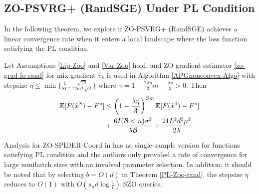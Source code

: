 \subsection{ZO-PSVRG+ (RandSGE) Under PL Condition}
In the following theorem, we explore if ZO-PSVRG+ (RandSGE) achieves a linear convergence rate when it enters a local landscape where the loss function satisfying the PL condition.
\begin{theorem}\label{PL-Zoo-rand}
Let Assumptions \ref{Lip-Zoo} and \ref{Var-Zoo} hold, and  ZO gradient estimator \eqref{zo-grad-fo-rand} for mix gradient $\hat{v}_k$ is used in
 Algorithm \ref{APGnonconvex-Algo} with stepsize $\eta \leq \min\{\frac{1}{8L}, \frac{\sqrt{\gamma b}}{12 m L \sqrt{d}}\}$ where $\gamma = 1-\frac{2\lambda\eta}{3} m-\frac{\lambda\eta}{3} > 0$. Then 
\begin{align}
\mathbb{E}[F(\tilde{x}^S) - {F}^*] & \leq   \left(1-\frac{\lambda\eta}{3}\right)^{Sm} \mathbb{E}[F(\tilde{x}^0) - {F}^*]\notag\\
&  + \frac{6I(\mathcal{B} < n) \sigma ^2}{\lambda\mathcal{B}}+\frac{21 L^2 d^2 \mu^2}{2\lambda}\label{PL-eq-error-rand}
\end{align}
\end{theorem}
\iffalse
\begin{corollary}\label{PL-Zo-Cor-rand}
Suppose the final iteration point $\tilde{x}^S$ in Algorithm \ref{APGnonconvex-Algo} satisfies $\E[F(\tilde{x}^S) - F^*]\leq \epsilon$ under PL condition. Under Assumptions \ref{Lip-Zoo} and \ref{Var-Zoo}, we let batch size $\mathcal{B} = \min\{\frac{6\sigma^2}{\lambda\epsilon},n\}$ and the smoothing parameter $\mu \leq \frac{\sqrt{\lambda\epsilon}}{4 L d}$. The number of SZO calls is bounded by
\[
(S\mathcal{B}d+Smb) = O(\frac{s_n d}{\lambda\eta m}\log\frac{1}{\epsilon}+\frac{b }{\lambda\eta}\log\frac{1}{\epsilon})
\]
where $s_n = \min \{n,\frac{1}{\lambda \epsilon}\}$.
The number of PO calls equals to the total number of iterations $T$ which is bounded by
\[
T = Sm = O(\frac{1}{\lambda\eta}\log\frac{1}{\epsilon})
\]
In particular, given the setting  $m=\sqrt{b}$ and $\eta = \frac{\sqrt{\gamma}}{12 L\sqrt{d}}$, the number of SZO calls  simplifies to 
$(S\mathcal{B}d+Smb) = O(\frac{\mathcal{B}d\sqrt{d}}{\lambda\sqrt{\gamma} m}\log\frac{1}{\epsilon}+\frac{b\sqrt{d}}{\lambda\sqrt{\gamma}}\log\frac{1}{\epsilon})$.
\end{corollary}
\fi
\begin{remark}
Analysis for ZO-SPIDER-Coord in \cite{ji2019improved} has no single-sample version for functions satisfying PL condition and the authors only provided a rate of convergence for large minibatch sizes with an involved parameter selection. In addition, it should be noted that by selecting  $b = O(d)$ in Theorem \ref{PL-Zoo-rand}, the stepsize $\eta$ reduces to $O(1)$ with $O(s_n d \log \frac{1}{\epsilon})$ SZO queries. 
\end{remark}

